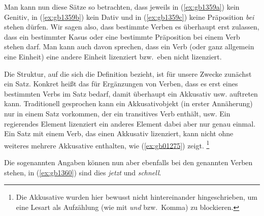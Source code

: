 \begin{exe}
  \ex\label{ex:gb1359}
  \begin{xlist}
  \end{xlist}
\end{exe}

Man kann nun diese Sätze so betrachten, dass jeweils in (\ref{ex:gb1359a}) kein Genitiv, in (\ref{ex:gb1359b}) kein Dativ und in (\ref{ex:gb1359c}) keine Präposition \textit{bei} stehen dürfen.
Wir sagen also, dass bestimmte Verben es überhaupt erst zulassen, dass ein bestimmter Kasus oder eine bestimmte Präposition bei einem Verb stehen darf.
Man kann auch davon sprechen, dass ein Verb (oder ganz allgemein eine Einheit) eine andere Einheit lizenziert bzw.\ eben nicht lizenziert.


Die Struktur, auf die sich die Definition bezieht, ist für unsere Zwecke zunächst ein Satz.
Konkret heißt das \zB für Ergänzungen von Verben, dass es erst eines bestimmten Verbs im Satz bedarf, damit überhaupt ein Akkusativ usw. auftreten kann.
Traditionell gesprochen kann ein Akkusativobjekt (in erster Annäherung) nur in einem Satz vorkommen, der ein transitives Verb enthält, usw.
Ein regierendes Element lizenziert ein anderes Element dabei aber nur genau einmal.
Ein Satz mit einem Verb, das einen Akkusativ lizenziert, kann nicht ohne weiteres mehrere Akkusative enthalten, wie (\ref{ex:gb01275}) zeigt.%
\footnote{Die Akkusative wurden hier bewusst nicht hintereinander hingeschrieben, um eine Lesart als Aufzählung (wie mit \textit{und} bzw.\ Komma) zu blockieren.}

\begin{exe}
  \ex\label{ex:gb01275}
  \begin{xlist}
  \end{xlist}
\end{exe}

Die sogenannten Angaben können nun aber ebenfalls bei den genannten Verben stehen, in (\ref{ex:gb1360}) sind dies \textit{jetzt} und \textit{schnell}.

